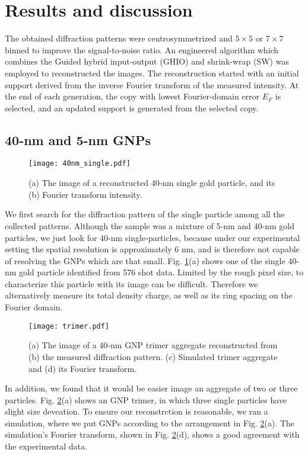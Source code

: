 \documentclass[10pt,letterpaper]{article}
\begin{document}
\section{Results and discussion}

The obtained diffraction patterns were centrosymmetrized and $5\times5$ or $7\times7$ binned to improve the signal-to-noise ratio. 
An engineered algorithm which combines the Guided hybrid input-output (GHIO) \cite{ghio} and shrink-wrap (SW) \cite{sw} was employed to reconstructed the images. 
The reconstruction started with an initial support derived from the inverse Fourier transform of the measured intensity. 
At the end of each generation, the copy with lowest Fourier-domain error $E_F$ is selected, and an updated support is generated from the selected copy.


\subsection{40-nm and 5-nm GNPs}

\begin{figure}
	\centering
	\texttt{[image: 40nm\_single.pdf]}
	\caption{(a) The image of a reconstructed 40-nm single gold particle, and its (b) Fourier transform intensity.}
	\label{fig:40nm_single}
\end{figure}

We first search for the diffraction pattern of the single particle among all the collected patterns. 
Although the sample was a mixture of 5-nm and 40-nm gold particles, we just look for 40-nm single-particles, because under our experimental setting the spatial resolution is approximately 6 nm, and is therefore not capable of resolving the GNPs which are that small.
Fig. \ref{fig:40nm_single}(a) shows one of the single 40-nm gold particle identified from 576 shot data.
Limited by the rough pixel size, to characterize this particle with its image can be difficult.
Therefore we alternatively measure its total density charge, as well as its ring spacing on the Fourier domain.

\begin{figure}
	\centering
	\texttt{[image: trimer.pdf]}%
	\caption{(a) The image of a 40-nm GNP trimer aggregate reconstructed from (b) the measured diffraction pattern. (c) Simulated trimer aggregate and (d) its Fourier transform.}
	\label{fig:trimer}
\end{figure}

In addition, we found that it would be easier image an aggregate of two or three particles. 
Fig. \ref{fig:trimer}(a) shows an GNP trimer, in which three single particles have slight size deveation.
To ensure our reconstrction is reasonable, we ran a simulation, where we put GNPs according to the arrangement in Fig. \ref{fig:trimer}(a). 
The simulation's Fourier transform, shown in Fig. \ref{fig:trimer}(d), shows a good agreement with the experimental data.
\end{document}
